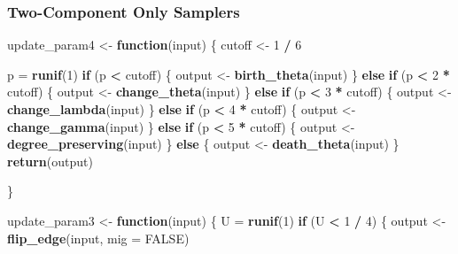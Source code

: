 \documentclass[11pt,a4paper]{article}
\newenvironment{Shaded}{\begin{snugshade}}{\end{snugshade}}
\newcommand{\ControlFlowTok}[1]{\textcolor[rgb]{0.13,0.29,0.53}{\textbf{#1}}}
\newcommand{\DataTypeTok}[1]{\textcolor[rgb]{0.13,0.29,0.53}{#1}}
\newcommand{\DecValTok}[1]{\textcolor[rgb]{0.00,0.00,0.81}{#1}}
\newcommand{\KeywordTok}[1]{\textcolor[rgb]{0.13,0.29,0.53}{\textbf{#1}}}
\newcommand{\NormalTok}[1]{#1}
\newcommand{\OperatorTok}[1]{\textcolor[rgb]{0.81,0.36,0.00}{\textbf{#1}}}
\newcommand{\OtherTok}[1]{\textcolor[rgb]{0.56,0.35,0.01}{#1}}
\newcommand{\StringTok}[1]{\textcolor[rgb]{0.31,0.60,0.02}{#1}}
\begin{document}
\hypertarget{two-component-only-samplers}{%
\subsubsection{Two-Component Only
Samplers}\label{two-component-only-samplers}}

\begin{Shaded}
\begin{Highlighting}[]
\NormalTok{update_param4 <-}\StringTok{ }\ControlFlowTok{function}\NormalTok{(input) \{}
\NormalTok{  cutoff <-}\StringTok{ }\DecValTok{1} \OperatorTok{/}\StringTok{ }\DecValTok{6}
  
\NormalTok{  p =}\StringTok{ }\KeywordTok{runif}\NormalTok{(}\DecValTok{1}\NormalTok{)}
  \ControlFlowTok{if}\NormalTok{ (p }\OperatorTok{<}\StringTok{ }\NormalTok{cutoff) \{}
\NormalTok{    output <-}\StringTok{ }\KeywordTok{birth_theta}\NormalTok{(input)}
\NormalTok{  \} }\ControlFlowTok{else} \ControlFlowTok{if}\NormalTok{ (p }\OperatorTok{<}\StringTok{ }\DecValTok{2} \OperatorTok{*}\StringTok{ }\NormalTok{cutoff) \{}
\NormalTok{    output <-}\StringTok{ }\KeywordTok{change_theta}\NormalTok{(input)}
\NormalTok{  \} }\ControlFlowTok{else} \ControlFlowTok{if}\NormalTok{ (p }\OperatorTok{<}\StringTok{ }\DecValTok{3} \OperatorTok{*}\StringTok{ }\NormalTok{cutoff) \{}
\NormalTok{    output <-}\StringTok{ }\KeywordTok{change_lambda}\NormalTok{(input)}
\NormalTok{  \}  }\ControlFlowTok{else} \ControlFlowTok{if}\NormalTok{ (p }\OperatorTok{<}\StringTok{ }\DecValTok{4} \OperatorTok{*}\StringTok{ }\NormalTok{cutoff) \{}
\NormalTok{    output <-}\StringTok{ }\KeywordTok{change_gamma}\NormalTok{(input)}
\NormalTok{  \} }\ControlFlowTok{else} \ControlFlowTok{if}\NormalTok{ (p }\OperatorTok{<}\StringTok{ }\DecValTok{5} \OperatorTok{*}\StringTok{ }\NormalTok{cutoff) \{}
\NormalTok{    output <-}\StringTok{ }\KeywordTok{degree_preserving}\NormalTok{(input)}
\NormalTok{  \}}
  \ControlFlowTok{else}\NormalTok{  \{}
\NormalTok{    output <-}\StringTok{ }\KeywordTok{death_theta}\NormalTok{(input)}
\NormalTok{  \}}
  \KeywordTok{return}\NormalTok{(output)}
  
\NormalTok{\}}

\NormalTok{update_param3 <-}\StringTok{ }\ControlFlowTok{function}\NormalTok{(input) \{}
\NormalTok{  U =}\StringTok{ }\KeywordTok{runif}\NormalTok{(}\DecValTok{1}\NormalTok{)}
  \ControlFlowTok{if}\NormalTok{ (U }\OperatorTok{<}\StringTok{ }\DecValTok{1} \OperatorTok{/}\StringTok{ }\DecValTok{4}\NormalTok{) \{}
\NormalTok{    output <-}\StringTok{ }\KeywordTok{flip_edge}\NormalTok{(input, }\DataTypeTok{mig =} \OtherTok{FALSE}\NormalTok{)}
    

\end{Highlighting}
\end{Shaded}
\end{document}

